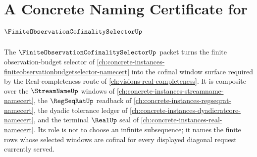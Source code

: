 \chapter{A Concrete Naming Certificate for $\FiniteObservationCofinalitySelectorUp$}
\label{ch:concrete-instances-finite-observation-cofinality-selector-namecert}

The $\FiniteObservationCofinalitySelectorUp$ packet turns the finite observation-budget selector of \autoref{ch:concrete-instances-finiteobservationbudgetselector-namecert} into the cofinal window surface required by the Real-completeness route of \autoref{ch:visions-real-completeness}. It is composite over the $\StreamNameUp$ windows of \autoref{ch:concrete-instances-streamname-namecert}, the $\RegSeqRatUp$ readback of \autoref{ch:concrete-instances-regseqrat-namecert}, the dyadic tolerance ledger of \autoref{ch:concrete-instances-dyadicratcore-namecert}, and the terminal $\RealUp$ seal of \autoref{ch:concrete-instances-real-namecert}. Its role is not to choose an infinite subsequence; it names the finite rows whose selected windows are cofinal for every displayed diagonal request currently served.

